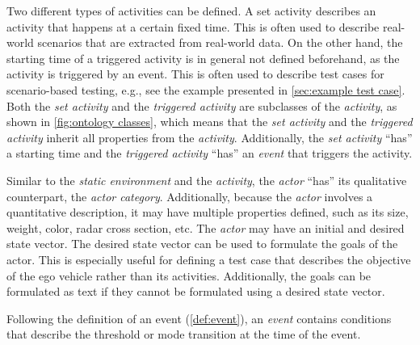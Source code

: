 Two different types of activities can be defined. A set activity describes an activity that happens at a certain fixed time. This is often used to describe real-world scenarios that are extracted from real-world data. On the other hand, the starting time of a triggered activity is in general not defined beforehand, as the activity is triggered by an event. This is often used to describe test cases for scenario-based testing, e.g., see the example presented in \cref{sec:example test case}. 
Both the \textit{set activity} and the \textit{triggered activity} are subclasses of the \textit{activity}, as shown in \cref{fig:ontology classes}, which means that the \textit{set activity} and the \textit{triggered activity} inherit all properties from the \textit{activity}. Additionally, the \textit{set activity} ``has'' a starting time and the \textit{triggered activity} ``has'' an \textit{event} that triggers the activity.

Similar to the \textit{static environment} and the \textit{activity}, the \textit{actor} ``has'' its qualitative counterpart, the \textit{actor category}. Additionally, because the \textit{actor} involves a quantitative description, it may have multiple properties defined, such as its size, weight, color, radar cross section, etc. The \textit{actor} may have an initial and desired state \cstart vector\cend. The desired state \cstart vector \cend can be used to formulate the goals of the actor. This is especially useful for defining a test case that describes the objective of the ego vehicle rather than its activities. Additionally, the goals can be formulated as text if they cannot be formulated using a desired state \cstart vector\cend.


Following the definition of an event (\cref{def:event}), an \textit{event} contains conditions that describe the threshold or mode transition at the time of the event.


